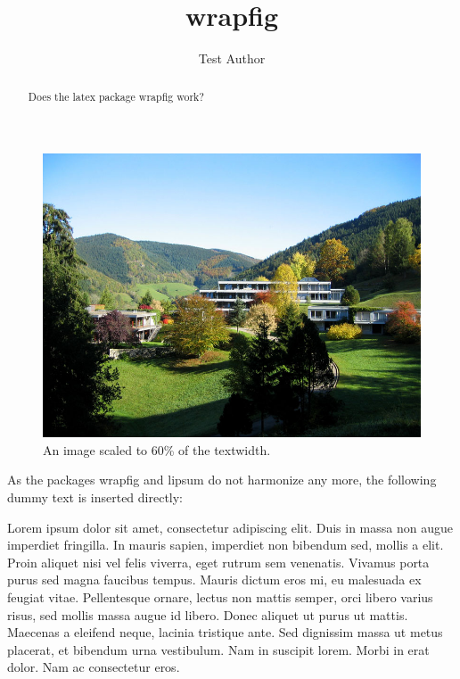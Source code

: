 \documentclass{snapshotmfo}
\author{Test Author}
\title{wrapfig}
\begin{document}
\begin{abstract}
Does the latex package wrapfig work?
\end{abstract}

\begin{figure}
\centering
\includegraphics[width= 0.6 \textwidth]{mfo.jpg}
\caption{An image scaled to 60\% of the textwidth.}
\end{figure}

As the packages wrapfig and lipsum do not harmonize any more,
the following dummy text is inserted directly:

Lorem ipsum dolor sit amet, consectetur adipiscing elit. Duis in massa non
augue imperdiet fringilla. In mauris sapien, imperdiet non bibendum sed,
mollis a elit. Proin aliquet nisi vel felis viverra, eget rutrum sem venenatis.
Vivamus porta purus sed magna faucibus tempus. Mauris dictum eros mi, eu
malesuada ex feugiat vitae. Pellentesque ornare, lectus non mattis semper,
orci libero varius risus, sed mollis massa augue id libero. Donec aliquet ut
purus ut mattis. Maecenas a eleifend neque, lacinia tristique ante. Sed
dignissim massa ut metus placerat, et bibendum urna vestibulum. Nam in suscipit
lorem. Morbi in erat dolor. Nam ac consectetur eros.
\end{document}
